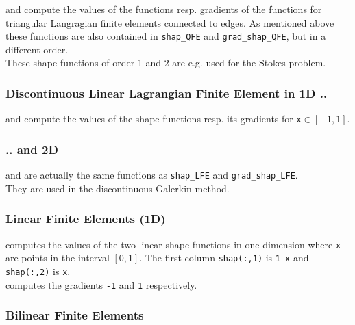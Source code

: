   and  compute the values of the functions resp. gradients of the functions for triangular Langragian finite elements connected to edges. As mentioned above these functions are also contained in {\tt shap\_QFE} and {\tt grad\_shap\_QFE}, but in a different order. \\

These shape functions of order 1 and 2 are e.g. used for the Stokes problem.


\subsubsection{Discontinuous Linear Lagrangian Finite Element in 1D ..} 

  and  compute the values of the shape functions resp. its gradients for {\tt x}$\in [-1,1]$.


\subsubsection{.. and 2D}

  and  are actually the same functions as {\tt shap\_LFE} and {\tt grad\_shap\_LFE}. \\ 

 They are used in the discontinuous Galerkin method.


\subsubsection{Linear Finite Elements (1D)} \label{sssect:shap_P1_1D} 

  computes the values of the two linear shape functions in one dimension where {\tt x} are points in the interval $[0,1]$. The first column {\tt shap(:,1)} is \texttt{1-x} and {\tt shap(:,2)} is \texttt{x}. \\

  computes the gradients \texttt{-1} and \texttt{1} respectively.



\subsubsection{Bilinear Finite Elements} \label{sssect:shap_BFE} 

